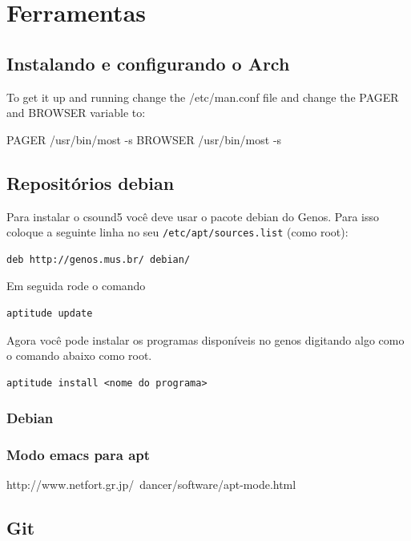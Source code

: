 \documentclass[12pt,brazil]{book}
\begin{document}
\part{Ferramentas}
\label{part:ferramentas}

\chapter{Instalando e configurando o Arch}
\label{cha:inst-e-conf}

To get it up and running change the /etc/man.conf file and change the PAGER and BROWSER variable to:

PAGER           /usr/bin/most -s
BROWSER         /usr/bin/most -s

\chapter{Repositórios debian}
\label{cha:repositorios-debian}

Para instalar o csound5 você deve usar o pacote debian do Genos. Para
isso coloque a seguinte linha no seu \texttt{/etc/apt/sources.list}
(como root):

\begin{verbatim}
deb http://genos.mus.br/ debian/
\end{verbatim}

Em seguida rode o comando

\begin{verbatim}
aptitude update
\end{verbatim}

Agora você pode instalar os programas disponíveis no genos digitando
algo como o comando abaixo como root.

\begin{verbatim}
aptitude install <nome do programa>
\end{verbatim}

\section{Debian}
\label{sec:debian}

\section{Modo emacs para apt}
\label{sec:modo-emacs-para}

http://www.netfort.gr.jp/~dancer/software/apt-mode.html

\chapter{Git}
\label{cha:git}
\end{document}
